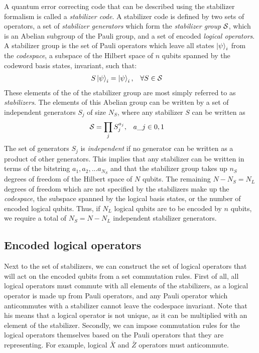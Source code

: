 A quantum error correcting code that can be described using the stabilizer formalism is called a \emph{stabilizer code}. A stabilizer code is defined by two sets of operators, a set of \emph{stabilizer generators} which form the \emph{stabilizer group} $\mathcal{S}$, which is an Abelian subgroup of the Pauli group, and a set of encoded \emph{logical operators}. A stabilizer group is the set of Pauli operators which leave all states $\ket{\psi}_i$ from the \emph{codespace}, a subspace of the Hilbert space of $n$ qubits spanned by the codeword basis states, invariant, such that:
\begin{align}
  & S\ket{\psi}_i = \ket{\psi}_i, && \forall S \in \mathcal{S} &
\end{align}
These elements of the of the stabilizer group are most simply referred to as \emph{stabilizers}. The elements of this Abelian group can be written by a set of independent generators $S_j$ of size $N_S$, where any stabilizer $S$ can be written as
\begin{align}
 & \mathcal{S} = \prod_{j}S_j^{a_j}, && a\_j \in {0, 1} &
\end{align}
The set of generators $S_j$ is \emph{independent} if no generator can be written as a product of other generators. This implies that any stabilizer can be written in terms of the bitstring $a_1, a_2, ...a_{N_S}$ and that the stabilizer group takes up $n_S$ degrees of freedom of the Hilbert space of $N$ qubits. The remaining $N-N_S = N_L$ degrees of freedom which are not specified by the stabilizers make up the \emph{codespace}, the subspace spanned by the logical basis states, or the number of encoded logical qubits. Thus, if $N_L$ logical qubits are to be encoded by $n$ qubits, we require a total of $N_S = N-N_L$ independent stabilizer generators.


\subsection{Encoded logical operators}

Next to the set of stabilizers, we can construct the set of logical operators that will act on the encoded qubits from a set commutation rules. First of all, all logical operators must commute with all elements of the stabilizers, as a logical operator is made up from Pauli operators, and any Pauli operator which anticommutes with a stabilizer cannot leave the codespace invariant. Note that his means that a logical operator is not unique, as it can be multiplied with an element of the stabilizer. Secondly, we can impose commutation rules for the logical operators themselves based on the Pauli operators that they are representing. For example, logical $\bar{X}$ and $\bar{Z}$ operators must anticommute.

